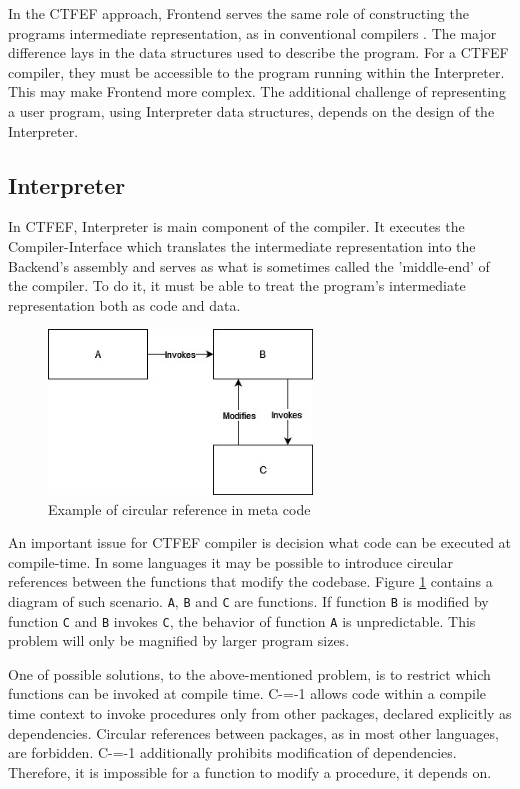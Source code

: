 In the CTFEF approach, Frontend serves the same role of constructing the programs intermediate representation, as in conventional compilers \cite{puntambekar:compiler_design}.
The major difference lays in the data structures used to describe the program.
For a CTFEF compiler, they must be accessible to the program running within the Interpreter.
This may make Frontend more complex.
The additional challenge of representing a user program, using Interpreter data structures, depends on the design of the Interpreter.


\subsection{Interpreter}
\label{Interpreter}

In CTFEF, Interpreter is main component of the compiler.
It executes the Compiler-Interface which translates the intermediate representation into the Backend's assembly and serves as what is sometimes called the 'middle-end' of the compiler\cite{hsu2021llvm}.
To do it, it must be able to treat the program's intermediate representation both as code and data.

\begin{figure}
	\centering
	\includegraphics[width=7cm]{pictures/circular-function-reference.jpg}
	\caption{Example of circular reference in meta code}
	\label{circular-function-reference}
\end{figure}

An important issue for CTFEF compiler is decision what code can be executed at compile-time.
In some languages it may be possible to introduce circular references between the functions that modify the codebase.
Figure \ref{circular-function-reference} contains a diagram of such scenario.
\lstinline{A}, \lstinline{B} and \lstinline{C} are functions.
If function \lstinline{B} is modified by function \lstinline{C} and \lstinline{B} invokes \lstinline{C}, the behavior of function \lstinline{A} is unpredictable.
This problem will only be magnified by larger program sizes.

One of possible solutions, to the above-mentioned problem, is to restrict which functions can be invoked at compile time.
C-=-1 allows code within a compile time context to invoke procedures only from other packages, declared explicitly as dependencies.
Circular references between packages, as in most other languages, are forbidden.
C-=-1 additionally  prohibits modification of dependencies.
Therefore, it is impossible for a function to modify a procedure, it depends on.

